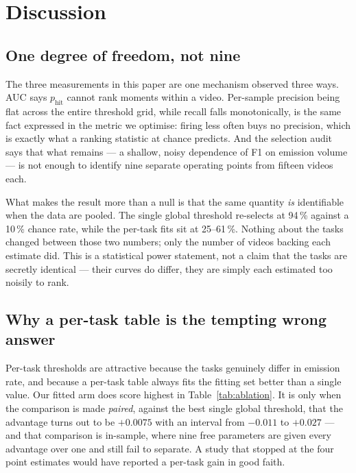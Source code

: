 \section{Discussion}
\label{sec:discussion}

\subsection{One degree of freedom, not nine}

The three measurements in this paper are one mechanism observed three ways. AUC
says $p_{\mathrm{hit}}$ cannot rank moments within a video. Per-sample precision
being flat across the entire threshold grid, while recall falls monotonically, is
the same fact expressed in the metric we optimise: firing less often buys no
precision, which is exactly what a ranking statistic at chance predicts. And the
selection audit says that what remains --- a shallow, noisy dependence of F1 on
emission volume --- is not enough to identify nine separate operating points from
fifteen videos each.

What makes the result more than a null is that the same quantity \emph{is}
identifiable when the data are pooled. The single global threshold re-selects at
94\,\% against a 10\,\% chance rate, while the per-task fits sit at 25--61\,\%.
Nothing about the tasks changed between those two numbers; only the number of
videos backing each estimate did. This is a statistical power statement, not a
claim that the tasks are secretly identical --- their curves do differ, they are
simply each estimated too noisily to rank.

\subsection{Why a per-task table is the tempting wrong answer}

Per-task thresholds are attractive because the tasks genuinely differ in emission
rate, and because a per-task table always fits the fitting set better than a single
value. Our fitted arm does score highest in Table~\ref{tab:ablation}. It is only
when the comparison is made \emph{paired}, against the best single global
threshold, that the advantage turns out to be $+0.0075$ with an interval from
$-0.011$ to $+0.027$ --- and that comparison is in-sample, where nine free
parameters are given every advantage over one and still fail to separate. A study
that stopped at the four point estimates would have reported a per-task gain in
good faith.

